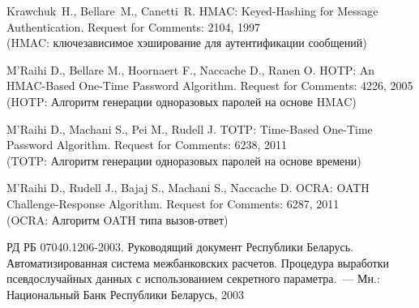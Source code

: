 \clearpage
\begin{thebibliography}{999}
Krawchuk~H., Bellare~M., Canetti~R.
HMAC: Keyed-Hashing for Message Authentication.
Request for Comments: 2104, 1997\\
{\small (HMAC: ключезависимое хэширование для аутентификации сообщений)}

M'Raihi D., 
Bellare M.,
Hoornaert F.,
Naccache D.,
Ranen O.
HOTP: An HMAC-Based One-Time Password Algorithm.
Request for Comments: 4226, 2005\\
{\small (HOTP: Алгоритм генерации одноразовых паролей на основе HMAC)}

M'Raihi D., 
Machani S.,
Pei M.,
Rudell J.
TOTP: Time-Based One-Time Password Algorithm.
Request for Comments: 6238, 2011\\
{\small (TOTP: Алгоритм генерации одноразовых паролей на основе времени)}

M'Raihi D., 
Rudell J.,
Bajaj S.,
Machani S.,
Naccache D.
OCRA: OATH Challenge-Response Algorithm.
Request for Comments: 6287, 2011\\
{\small (OCRA: Алгоритм OATH типа вызов-ответ)}

РД РБ 07040.1206-2003. 
Руководящий документ Республики Беларусь. 
Автоматизированная система межбанковских расчетов. 
Процедура выработки псевдослучайных данных с использованием 
секретного параметра.~--- 
Мн.: Национальный Банк Республики Беларусь, 2003

\label{LastBib}
\end{thebibliography}

